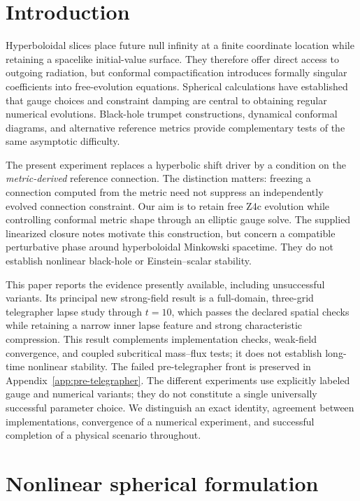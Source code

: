 \section{Introduction}
Hyperboloidal slices place future null infinity at a finite coordinate location while retaining a spacelike initial-value surface. They therefore offer direct access to outgoing radiation, but conformal compactification introduces formally singular coefficients into free-evolution equations. Spherical calculations have established that gauge choices and constraint damping are central to obtaining regular numerical evolutions\cite{VHH2015,VH2014,VH2018}. Black-hole trumpet constructions, dynamical conformal diagrams, and alternative reference metrics provide complementary tests of the same asymptotic difficulty\cite{VV2023,VV2024,VVValente2024}.

The present experiment replaces a hyperbolic shift driver by a condition on the \emph{metric-derived} reference connection. The distinction matters: freezing a connection computed from the metric need not suppress an independently evolved connection constraint. Our aim is to retain free Z4c evolution while controlling conformal metric shape through an elliptic gauge solve. The supplied linearized closure notes motivate this construction, but concern a compatible perturbative phase around hyperboloidal Minkowski spacetime. They do not establish nonlinear black-hole or Einstein--scalar stability.

This paper reports the evidence presently available, including unsuccessful variants. Its principal new strong-field result is a full-domain, three-grid telegrapher lapse study through $t=10$, which passes the declared spatial checks while retaining a narrow inner lapse feature and strong characteristic compression. This result complements implementation checks, weak-field convergence, and coupled subcritical mass--flux tests; it does not establish long-time nonlinear stability. The failed pre-telegrapher front is preserved in Appendix~\ref{app:pre-telegrapher}. The different experiments use explicitly labeled gauge and numerical variants; they do not constitute a single universally successful parameter choice. We distinguish an exact identity, agreement between implementations, convergence of a numerical experiment, and successful completion of a physical scenario throughout.

\section{Nonlinear spherical formulation}
\label{sec:formulation}
